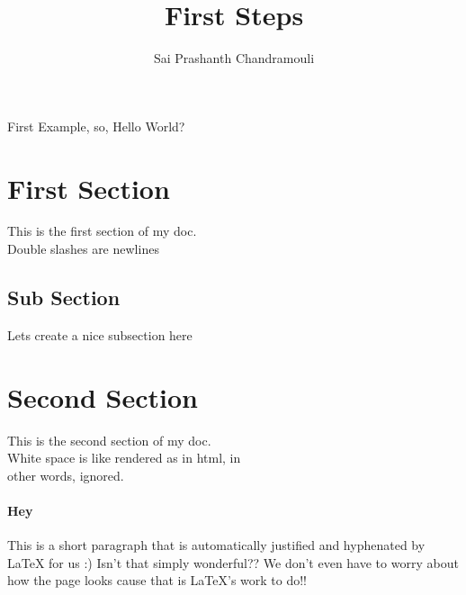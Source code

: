 \documentclass[a4paper,12pt,titlepage]{article} %
\author{Sai Prashanth Chandramouli}
\title{First Steps}
\begin{document}
	\maketitle
	\tableofcontents
	First Example, so, Hello World?
	\section{First Section}
		This is the first section of my doc.\\
		Double slashes are newlines
		\subsection[Sub Short]{Sub Section}
			Lets create a nice subsection here
	\section[Short Title]{Second Section}	
		This is the second section of my doc.\\
		White space is like rendered as in html, in\\
		other words, ignored.
		
	\paragraph{Hey}
		This is a short paragraph that is automatically justified and hyphenated by LaTeX for us :) Isn't that simply wonderful?? We don't even have to worry about how the page looks cause that is LaTeX's work to do!!
\end{document}
